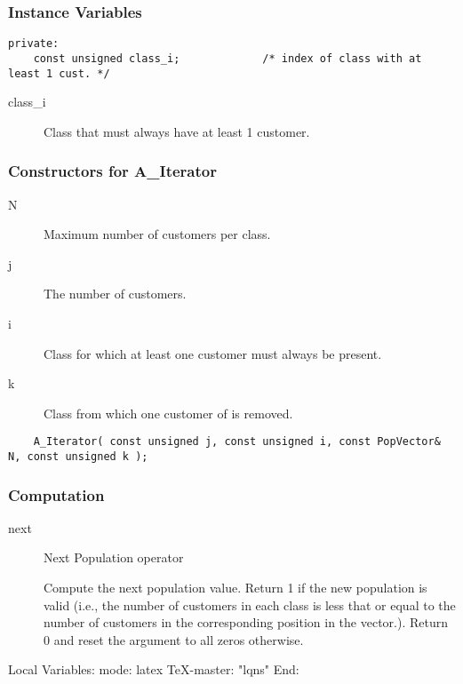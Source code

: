 \subsubsection{Instance Variables}
\label{sec:pop-AIter-ivars}

\begin{verbatim}
private:
    const unsigned class_i;             /* index of class with at least 1 cust. */
\end{verbatim}

\begin{description}
\item[class_i] \texonly{---} Class that must always have at least 1 customer.
\end{description}

\subsubsection{Constructors for A_Iterator}

\begin{description}
\item[N] \texonly{---} Maximum number of customers per class.
\item[j] \texonly{---} The number of customers.
\item[i] \texonly{---} Class for which at least one customer must
  always be present.
\item[k] \texonly{---} Class from which one customer of  is removed.

\end{description}

\begin{verbatim}
    A_Iterator( const unsigned j, const unsigned i, const PopVector& N, const unsigned k );
\end{verbatim}

\subsubsection{Computation}

\begin{description}
\item[next] \texonly{---} Next Population operator\\

  Compute the next population value.  Return 1 if the new population is
  valid (i.e., the number of customers in each class is less that or
  equal to the number of customers in the corresponding position in the
   vector.).  Return 0 and reset the argument  to all
  zeros otherwise.
\end{description}


\C Local Variables: 
\C mode: latex
\C TeX-master: "lqns"
\C End: 

